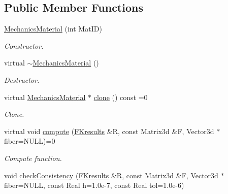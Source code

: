 \subsection*{Public Member Functions}
\begin{DoxyCompactItemize}
\item 
\hypertarget{classvoom_1_1_mechanics_material_a8ada87cbee671983effd741dec424536}{
\hyperlink{classvoom_1_1_mechanics_material_a8ada87cbee671983effd741dec424536}{MechanicsMaterial} (int MatID)}
\label{classvoom_1_1_mechanics_material_a8ada87cbee671983effd741dec424536}

\begin{DoxyCompactList}\small\item\em Constructor. \item\end{DoxyCompactList}\item 
\hypertarget{classvoom_1_1_mechanics_material_a885bf927f6480ff577d6934c8272e832}{
virtual \hyperlink{classvoom_1_1_mechanics_material_a885bf927f6480ff577d6934c8272e832}{$\sim$MechanicsMaterial} ()}
\label{classvoom_1_1_mechanics_material_a885bf927f6480ff577d6934c8272e832}

\begin{DoxyCompactList}\small\item\em Destructor. \item\end{DoxyCompactList}\item 
\hypertarget{classvoom_1_1_mechanics_material_a443b8bae4637df4dcb049185ea272962}{
virtual \hyperlink{classvoom_1_1_mechanics_material}{MechanicsMaterial} $\ast$ \hyperlink{classvoom_1_1_mechanics_material_a443b8bae4637df4dcb049185ea272962}{clone} () const =0}
\label{classvoom_1_1_mechanics_material_a443b8bae4637df4dcb049185ea272962}

\begin{DoxyCompactList}\small\item\em Clone. \item\end{DoxyCompactList}\item 
\hypertarget{classvoom_1_1_mechanics_material_a5ea31f34fef964858e089a8585c2d6ae}{
virtual void \hyperlink{classvoom_1_1_mechanics_material_a5ea31f34fef964858e089a8585c2d6ae}{compute} (\hyperlink{structvoom_1_1_mechanics_material_1_1_f_kresults}{FKresults} \&R, const Matrix3d \&F, Vector3d $\ast$fiber=NULL)=0}
\label{classvoom_1_1_mechanics_material_a5ea31f34fef964858e089a8585c2d6ae}

\begin{DoxyCompactList}\small\item\em Compute function. \item\end{DoxyCompactList}\item 
\hypertarget{classvoom_1_1_mechanics_material_af8582d4f201b071a7e2340dd0a0f5769}{
void \hyperlink{classvoom_1_1_mechanics_material_af8582d4f201b071a7e2340dd0a0f5769}{checkConsistency} (\hyperlink{structvoom_1_1_mechanics_material_1_1_f_kresults}{FKresults} \&R, const Matrix3d \&F, Vector3d $\ast$fiber=NULL, const Real h=1.0e-\/7, const Real tol=1.0e-\/6)}
\label{classvoom_1_1_mechanics_material_af8582d4f201b071a7e2340dd0a0f5769}


\end{DoxyCompactItemize}
